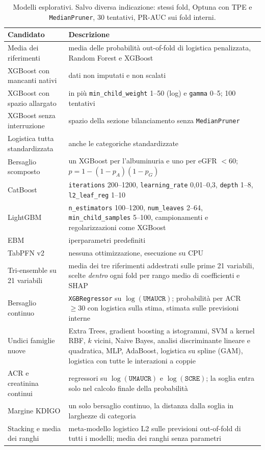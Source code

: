 \documentclass[a4paper, 12pt, oneside]{book}
\begin{document}
\begin{table}[H]
	\centering
	\small
	\caption{Modelli esplorativi. Salvo diversa indicazione: stessi fold, Optuna con TPE e \texttt{MedianPruner}, 30 tentativi, PR-AUC sui fold interni.}
	\label{tab:esplorativi}
	\begin{tabularx}{\textwidth}{@{}>{\raggedright\arraybackslash}p{3.6cm} >{\raggedright\arraybackslash}X@{}}
		\toprule
		Candidato & Descrizione \\
		\midrule
		Media dei riferimenti & media delle probabilità out-of-fold di logistica penalizzata, Random Forest e XGBoost \\
		XGBoost con mancanti nativi & dati non imputati e non scalati \\
		XGBoost con spazio allargato & in più \texttt{min\_child\_weight} 1--50 (log) e \texttt{gamma} 0--5; 100 tentativi \\
		XGBoost senza interruzione & spazio della sezione bilanciamento senza \texttt{MedianPruner} \\
		Logistica tutta standardizzata & anche le categoriche standardizzate \\
		Bersaglio scomposto & un XGBoost per l'albuminuria e uno per eGFR $<60$; $p = 1 - (1-p_A)(1-p_G)$ \\
		CatBoost & \texttt{iterations} 200--1200, \texttt{learning\_rate} 0,01--0,3, \texttt{depth} 1--8, \texttt{l2\_leaf\_reg} 1--10 \\
		LightGBM & \texttt{n\_estimators} 100--1200, \texttt{num\_leaves} 2--64, \texttt{min\_child\_samples} 5--100, campionamenti e regolarizzazioni come XGBoost \\
		EBM & iperparametri predefiniti \\
		TabPFN v2 & nessuna ottimizzazione, esecuzione su CPU \\
		Tri-ensemble su 21 variabili & media dei tre riferimenti addestrati sulle prime 21 variabili, scelte \emph{dentro} ogni fold per rango medio di coefficienti e SHAP \\
		Bersaglio continuo & \texttt{XGBRegressor} su $\log(\texttt{UMAUCR})$; probabilità per ACR $\geq 30$ con logistica sulla stima, stimata sulle previsioni interne \\
		Undici famiglie nuove & Extra Trees, gradient boosting a istogrammi, SVM a kernel RBF, $k$ vicini, Naive Bayes, analisi discriminante lineare e quadratica, MLP, AdaBoost, logistica su spline (GAM), logistica con tutte le interazioni a coppie \\
		ACR e creatinina continui & regressori su $\log(\texttt{UMAUCR})$ e $\log(\texttt{SCRE})$; la soglia entra solo nel calcolo finale della probabilità \\
		Margine KDIGO & un solo bersaglio continuo, la distanza dalla soglia in larghezze di categoria \\
		Stacking e media dei ranghi & meta-modello logistico L2 sulle previsioni out-of-fold di tutti i modelli; media dei ranghi senza parametri \\
		\bottomrule
	\end{tabularx}
\end{table}
\end{document}
